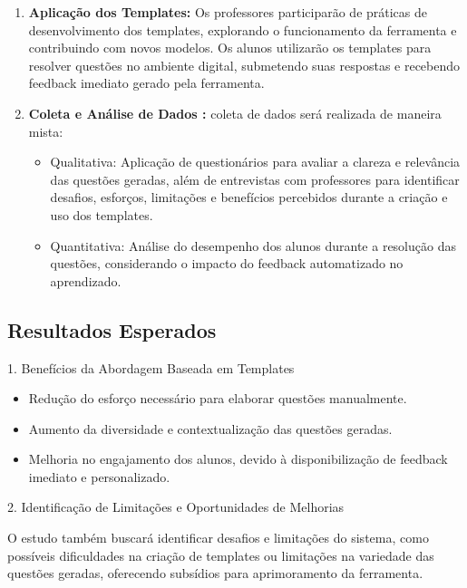 \begin{enumerate}[label=\textbf{\alph*)}]
    \item \textbf{Aplicação dos Templates: }  Os professores participarão de práticas de desenvolvimento dos templates, explorando o funcionamento da ferramenta e contribuindo com novos modelos. Os alunos utilizarão os templates para resolver questões no ambiente digital, submetendo suas respostas e recebendo feedback imediato gerado pela ferramenta. 
    \item \textbf{Coleta e Análise de Dados :} coleta de dados será realizada de maneira mista:

\begin{itemize}
    \item Qualitativa: Aplicação de questionários para avaliar a clareza e relevância das questões geradas, além de entrevistas com professores para identificar desafios, esforços, limitações e benefícios percebidos durante a criação e uso dos templates.
    \item Quantitativa: Análise do desempenho dos alunos durante a resolução das questões, considerando o impacto do feedback automatizado no aprendizado.
\end{itemize}


\end{enumerate}

\subsection{\textbf{Resultados Esperados}}

1. Benefícios da Abordagem Baseada em Templates

\begin{itemize}
    \item Redução do esforço necessário para elaborar questões manualmente.
    \item Aumento da diversidade e contextualização das questões geradas.
    \item Melhoria no engajamento dos alunos, devido à disponibilização de feedback imediato e personalizado.
\end{itemize}
2. Identificação de Limitações e Oportunidades de Melhorias

O estudo também buscará identificar desafios e limitações do sistema, como possíveis dificuldades na criação de templates ou limitações na variedade das questões geradas, oferecendo subsídios para aprimoramento da ferramenta.

 

